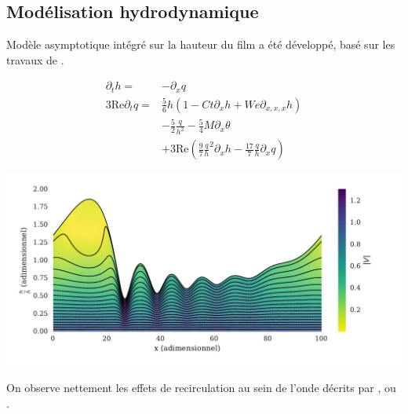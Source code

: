 \documentclass[a0,portrait]{a0poster}
\begin{document}
\begin{multicols}{2}
    \subsection*{Modélisation hydrodynamique}
    Modèle asymptotique intégré sur la hauteur du film a été développé, basé sur les travaux de \textcite{Ruyer-Quil2000}.

    \begin{multicols}{2}
        \begin{align*}
            \partial_t h =& -\partial_x q\\
            3 \mathrm{Re} \partial_t q =& \frac{5}{6} h
                \left(
                    1 - Ct \partial_x h + We \partial_{x,x,x} h
                \right)\\
            & - \frac{5}{2}\frac{q}{h^2}
            - \frac{5}{4} M \partial_x \theta \\
            & + 3 \mathrm{Re}
                \left(
                    \frac{9}{7}\frac{q}{h}^2 \partial_x h - \frac{17}{7}\frac{q}{h} \partial_x q
                \right)
        \end{align*}
        \columnbreak
        \begin{center}\vspace{.2cm}
            \includegraphics[width=0.95\columnwidth]{01-established_wave_streamlines}
            \label{fig:streamlines}
        \end{center}\vspace{.2cm}
    \end{multicols}

    On observe nettement les effets de recirculation au sein de l'onde décrits par \textcite{Brauner1989}, \textcite{Yoshimura1996} ou \textcite{Miyara1999}.


\end{multicols}
\end{document}
